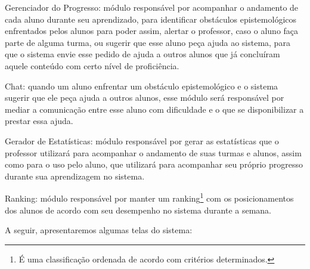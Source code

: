 \begin{alineascomponto}
	\item Gerenciador do Progresso: módulo responsável por acompanhar o andamento de cada aluno durante seu aprendizado, para identificar obstáculos epistemológicos enfrentados pelos alunos para poder assim, alertar o professor, caso o aluno faça parte de alguma turma, ou sugerir que esse aluno peça ajuda ao sistema, para que o sistema envie esse pedido de ajuda a outros alunos que já concluíram aquele conteúdo com certo nível de proficiência.
	\item Chat: quando um aluno enfrentar um obstáculo epistemológico e o sistema sugerir que ele peça ajuda a outros alunos, esse módulo será responsável por mediar a comunicação entre esse aluno com dificuldade e o que se disponibilizar a prestar essa ajuda.
    \item Gerador de Estatísticas: módulo responsável por gerar as estatísticas que o professor utilizará para acompanhar o andamento de suas turmas e alunos, assim como para o uso pelo aluno, que utilizará para acompanhar seu próprio progresso durante sua aprendizagem no sistema.
    \item Ranking: módulo responsável por manter um ranking\footnote{É uma classificação ordenada de acordo com critérios determinados.} com os posicionamentos dos alunos de acordo com seu desempenho no sistema durante a semana.
    
\end{alineascomponto}

A seguir, apresentaremos algumas telas do sistema:

